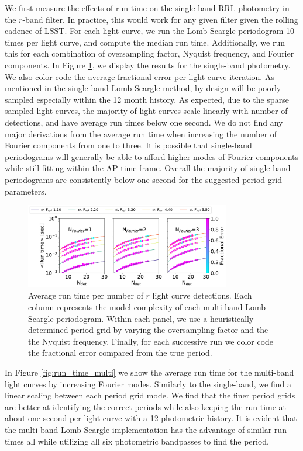 \documentclass[DM,authoryear,toc]{lsstdoc}
\begin{document}
We first measure the effects of run time on the single-band RRL photometry in the $r$-band filter.
In practice, this would work for any given filter given the rolling cadence of LSST.
For each light curve, we run the Lomb-Scargle periodogram 10 times per light curve, and compute the median run time.
Additionally, we run this for each combination of oversampling factor, Nyquist frequency, and Fourier components.
In Figure \ref{fig:run_time_single}, we display the results for the single-band photometry.
We also color code the average fractional error per light curve iteration.
As mentioned in the single-band Lomb-Scargle method, by design will be poorly sampled especially within the 12 month history.
As expected, due to the sparse sampled light curves, the majority of light curves scale linearly with number of detections, and have average run times below one second.
We do not find any major derivations from the average run time when increasing the number of Fourier components from one to three.
It is possible that single-band periodograms will generally be able to afford higher modes of Fourier components while still fitting within the AP time frame.
Overall the majority of single-band periodograms are consistently below one second for the suggested period grid parameters.


 
 \begin{figure}
  \includegraphics[width=0.8\textwidth]{figures/singleRUN_LSP_RRL.pdf}
  \centering 
  \caption{Average run time per number of $r$ light curve detections.
Each column represents the model complexity of each multi-band Lomb Scargle periodogram.
Within each panel, we use a heuristically determined period grid by varying the oversampling factor and the the Nyquist frequency.
 Finally, for each successive run we color code the fractional error compared from the true period.}
  \label{fig:run_time_single}
\end{figure}

In Figure \ref{fig:run_time_multi} we show the average run time for the multi-band light curves by increasing Fourier modes.
Similarly to the single-band, we find a linear scaling between each period grid mode.
We find that the finer period grids are better at identifying the correct periods while also keeping the run time at about one second per light curve with a 12 photometric history.
It is evident that the multi-band Lomb-Scargle implementation has the advantage of similar run-times all while utilizing all six photometric bandpasses to find the period.
\end{document}
